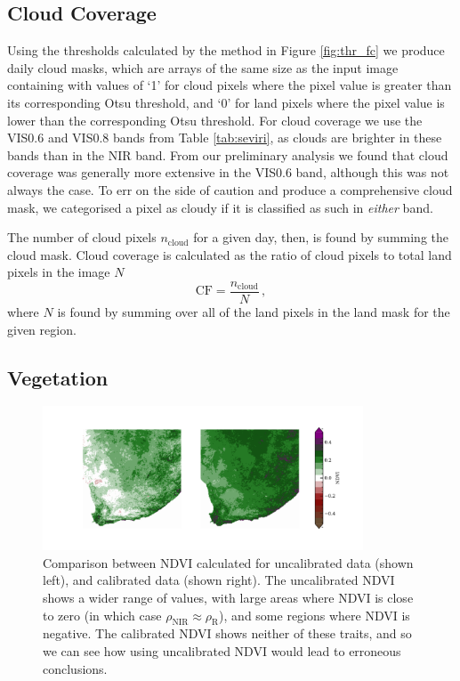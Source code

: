 \subsection{Cloud Coverage}
Using the thresholds calculated by the method in Figure \ref{fig:thr_fc} we
produce daily cloud masks, which are arrays of the same size as the input image
containing with values of `1' for cloud pixels where the pixel value is greater
than its corresponding Otsu threshold, and `0' for land pixels where the pixel
value is lower than the corresponding Otsu threshold. For cloud coverage we use
the VIS0.6 and VIS0.8 bands from Table \ref{tab:seviri}, as clouds are brighter
in these bands than in the NIR band. From our preliminary analysis we found that
cloud coverage was generally more extensive in the VIS0.6 band, although this
was not always the case. To err on the side of caution and produce a
comprehensive cloud mask, we categorised a pixel as cloudy if it is classified
as such in \emph{either} band.

The number of cloud pixels $n_{\mathrm{cloud}}$ for a given day, then, is found
by summing the cloud mask. Cloud coverage is calculated as the ratio of cloud
pixels to total land pixels in the image $N$
\begin{equation}
  \mathrm{CF} = \frac{n_{\mathrm{cloud}}}{N} \,,
  \label{eq:cloud_frac}
\end{equation}
where $N$ is found by summing over all of the land pixels in the land mask for
the given region.

\subsection{Vegetation}

\begin{figure}
  \centering
  \includegraphics[width=0.85\textwidth]{figures/ndvi_calibration_comparison.pdf}
  \caption{Comparison between NDVI calculated for uncalibrated data (shown left),
    and calibrated data (shown right). The uncalibrated NDVI shows a wider range
    of values, with large areas where NDVI is close to zero (in which case
    $\rho_{\textrm{NIR}}\approx\rho_{\textrm{R}}$), and some regions where NDVI is
    negative. The calibrated NDVI shows neither of these traits, and so we can
    see how using uncalibrated NDVI would lead to erroneous conclusions.}
  \label{fig:calibrationcomp}
\end{figure}

